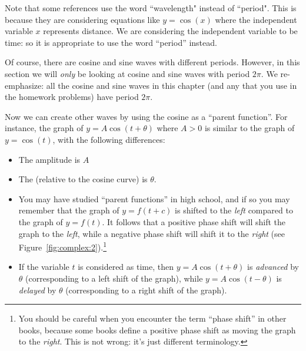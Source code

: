 Note that some references use the word ``wavelength" instead of ``period". This is because they are considering equations like $y = \cos(x)$ where the independent variable $x$ represents distance. We are considering the independent variable to be time: so it is appropriate to use the word ``period'' instead.

Of course, there are cosine and sine waves with different periods. However, in this section  we will \emph{only}  be looking at cosine and sine waves with period $2\pi$. We re-emphasize:  all the cosine and sine waves in this chapter (and any that you use in the homework problems) have period $2 \pi$.

Now we can create other waves by using the cosine as a ``parent function''. For instance, the graph of
$y = A  \cos ( t + \theta) $ where $A > 0$
is similar to the graph of $y = \cos(t)$, with the following differences:

\begin{itemize}
\item
The amplitude is $A$
\item
The  (relative to the cosine curve) is $\theta$. 
\end{itemize}

\begin{rem} 
\begin{itemize}
\item
You may have studied ``parent functions'' in high school, and if so you may remember that the graph of $y = f(t+c)$ is shifted to the \emph{left} compared to the graph of $y = f(t)$.  It follows that a positive phase shift will shift the graph to the \emph{left}, while a negative phase shift will shift it to the \emph{right} (see Figure~\ref{fig:complex:2}).\footnote{ You should be careful when you encounter the term ``phase shift'' in other books, because some books define a positive phase shift as moving the graph to the \emph{right}. This is not wrong: it's just different terminology.}
\item 
If the variable $t$ is considered as time, then $y = A  \cos ( t + \theta) $ is \emph{advanced} by $\theta$ (corresponding to a left shift of the graph), while $y = A  \cos ( t - \theta) $ is \emph{delayed} by $\theta$ (corresponding to a right shift of the graph).  
\end{itemize}
\end{rem}
 
